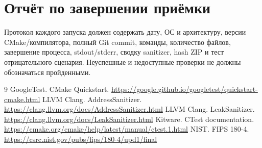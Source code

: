 \documentclass[12pt,a4paper]{article}
\begin{document}
\section{Отчёт по завершении приёмки}

Протокол каждого запуска должен содержать дату, ОС и архитектуру,
версии CMake/компилятора, полный Git commit, команды, количество файлов,
завершение процесса, stdout/stderr, сводку sanitizer, hash ZIP и
тест отрицательного сценария. Неуспешные и недоступные проверки не должны
обозначаться пройденными.

\begingroup
\footnotesize
\setlength{\parskip}{0pt}
\begin{thebibliography}{9}
 GoogleTest. CMake Quickstart. \url{https://google.github.io/googletest/quickstart-cmake.html}
 LLVM Clang. AddressSanitizer. \url{https://clang.llvm.org/docs/AddressSanitizer.html}
 LLVM Clang. LeakSanitizer. \url{https://clang.llvm.org/docs/LeakSanitizer.html}
 Kitware. CTest documentation. \url{https://cmake.org/cmake/help/latest/manual/ctest.1.html}
 NIST. FIPS 180-4. \url{https://csrc.nist.gov/pubs/fips/180-4/upd1/final}
\end{thebibliography}
\endgroup
\end{document}
